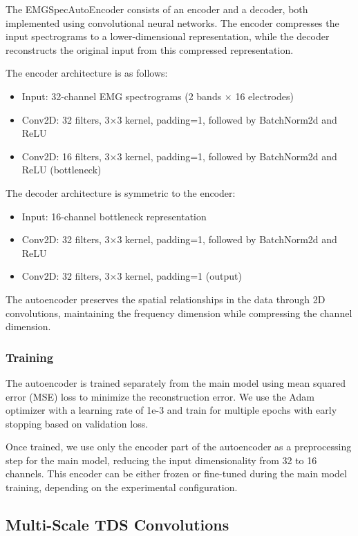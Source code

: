 The EMGSpecAutoEncoder consists of an encoder and a decoder, both implemented using convolutional neural networks. The encoder compresses the input spectrograms to a lower-dimensional representation, while the decoder reconstructs the original input from this compressed representation.

The encoder architecture is as follows:
\begin{itemize}
    \item Input: 32-channel EMG spectrograms (2 bands × 16 electrodes)
    \item Conv2D: 32 filters, 3×3 kernel, padding=1, followed by BatchNorm2d and ReLU
    \item Conv2D: 16 filters, 3×3 kernel, padding=1, followed by BatchNorm2d and ReLU (bottleneck)
\end{itemize}

The decoder architecture is symmetric to the encoder:
\begin{itemize}
    \item Input: 16-channel bottleneck representation
    \item Conv2D: 32 filters, 3×3 kernel, padding=1, followed by BatchNorm2d and ReLU
    \item Conv2D: 32 filters, 3×3 kernel, padding=1 (output)
\end{itemize}

The autoencoder preserves the spatial relationships in the data through 2D convolutions, maintaining the frequency dimension while compressing the channel dimension.

\subsubsection{Training}

The autoencoder is trained separately from the main model using mean squared error (MSE) loss to minimize the reconstruction error. We use the Adam optimizer with a learning rate of 1e-3 and train for multiple epochs with early stopping based on validation loss.

Once trained, we use only the encoder part of the autoencoder as a preprocessing step for the main model, reducing the input dimensionality from 32 to 16 channels. This encoder can be either frozen or fine-tuned during the main model training, depending on the experimental configuration.

\subsection{Multi-Scale TDS Convolutions}\label{subsec:multiscale}

